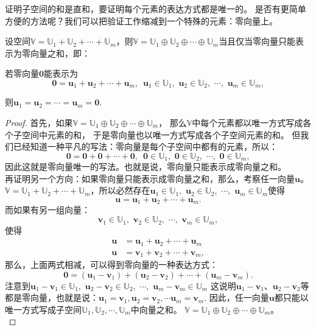 \documentclass[12pt,UTF8]{ctexbook}
\begin{document}
证明子空间的和是直和，要证明每个元素的表达方式都是唯一的。
是否有更简单方便的方法呢？我们可以把验证工作缩减到一个特殊的元素：零向量上。
\begin{pp}\label{pp:1_8}
    设空间$\mathbb{V} = \mathbb{U}_1 + \mathbb{U}_2 + \cdots + \mathbb{U}_m$，则$\mathbb{V} = \mathbb{U}_1 \oplus \mathbb{U}_2 \oplus \cdots \oplus \mathbb{U}_m$当且仅当零向量只能表示为零向量之和，即：

    若零向量$\mathbf{0}$能表示为
    $$ \mathbf{0} = \mathbf{u}_1 + \mathbf{u}_2 + \cdots + \mathbf{u}_m,\,\,\, \mathbf{u}_1\in \mathbb{U}_1,\,\,\mathbf{u}_2\in \mathbb{U}_2,\,\,\cdots,\,\,\mathbf{u}_m\in \mathbb{U}_m, $$
    
    则$\mathbf{u}_1 = \mathbf{u}_2 = \cdots = \mathbf{u}_m = \mathbf{0}.$
\end{pp}
\begin{proof} %
    首先，如果$\mathbb{V} = \mathbb{U}_1 \oplus \mathbb{U}_2 \oplus \cdots \oplus \mathbb{U}_m$，
    那么$\mathbb{V}$中每个元素都以唯一方式写成各个子空间中元素的和，
    于是零向量也以唯一方式写成各个子空间元素的和。
    但我们已经知道一种平凡的写法：零向量是每个子空间中都有的元素，所以：
    $$ \mathbf{0} = \mathbf{0} + \mathbf{0} + \cdots + \mathbf{0},\,\,\, \mathbf{0}\in \mathbb{U}_1,\,\,\mathbf{0}\in \mathbb{U}_2,\,\,\cdots,\,\,\mathbf{0}\in \mathbb{U}_m, $$
    因此这就是零向量唯一的写法。也就是说，零向量只能表示成零向量之和。\\
    再证明另一个方向：如果零向量只能表示成零向量之和，那么，考察任一向量$\mathbf{u}$。\\
    $\mathbb{V} = \mathbb{U}_1 + \mathbb{U}_2 + \cdots + \mathbb{U}_m$，所以必然存在$\mathbf{u}_1\in \mathbb{U}_1,\,\,\mathbf{u}_2\in \mathbb{U}_2,\,\,\cdots,\,\,\mathbf{u}_m\in \mathbb{U}_m$使得
    $$ \mathbf{u} = \mathbf{u}_1 + \mathbf{u}_2 + \cdots + \mathbf{u}_m.$$
    而如果有另一组向量：
    $$\mathbf{v}_1\in \mathbb{U}_1,\,\,\mathbf{v}_2\in \mathbb{U}_2,\,\,\cdots,\,\,\mathbf{v}_m\in \mathbb{U}_m, $$
    使得
    \begin{align*} 
        \mathbf{u} &= \mathbf{u}_1 + \mathbf{u}_2 + \cdots + \mathbf{u}_m  \\
        \mathbf{u} &= \mathbf{v}_1 + \mathbf{v}_2 + \cdots + \mathbf{v}_m, 
    \end{align*}
    那么，上面两式相减，可以得到零向量的一种表达方式：
    $$ \mathbf{0} = (\mathbf{u}_1 - \mathbf{v}_1) + (\mathbf{u}_2 - \mathbf{v}_2) + \cdots + (\mathbf{u}_m - \mathbf{v}_m). $$
    注意到$\mathbf{u}_1 - \mathbf{v}_1\in \mathbb{U}_1,\,\,\mathbf{u}_2 - \mathbf{v}_2\in \mathbb{U}_2,\,\,\cdots,\,\,\mathbf{u}_m - \mathbf{v}_m\in \mathbb{U}_m$
    这说明$\mathbf{u}_1 - \mathbf{v}_1$、$\mathbf{u}_2 - \mathbf{v}_2$等都是零向量，也就是说：$ \mathbf{u}_1 = \mathbf{v}_1, \mathbf{u}_2 = \mathbf{v}_2, \cdots \mathbf{u}_m = \mathbf{v}_m.$
    因此，任一向量$\mathbf{u}$都只能以唯一方式写成子空间$\mathbb{U}_1, \mathbb{U}_2, \cdots, \mathbb{U}_m$中向量之和。
    $\mathbb{V} = \mathbb{U}_1 \oplus \mathbb{U}_2 \oplus \cdots \oplus \mathbb{U}_m$。\\
\end{proof}
\end{document}
